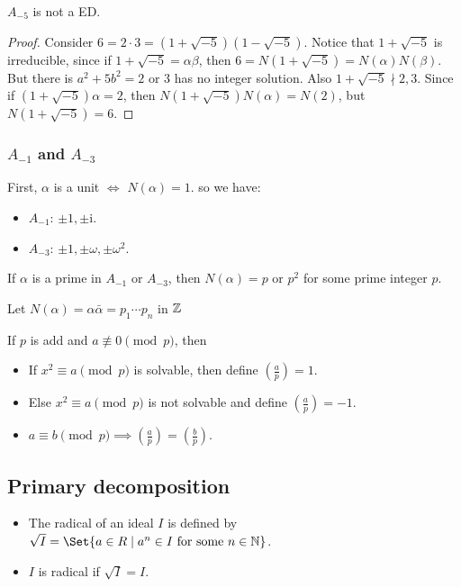 \begin{example}
  $A_{-5}$ is not a ED.

  \begin{proof}
    Consider $6 = 2 \cdot 3 = (1 + \sqrt{-5})(1 - \sqrt{-5})$.
    Notice that $1 + \sqrt{-5}$ is irreducible, since if $1 + \sqrt{-5} = \alpha \beta$,
    then $6 = N(1 + \sqrt{-5}) = N(\alpha) N(\beta)$. But there is
    $a^2 + 5b^2 = 2 \text{ or } 3$ has no integer solution.
    Also $1 + \sqrt{-5} \nmid 2, 3$. Since if $(1 + \sqrt{-5}) \alpha = 2$,
    then $N(1 + \sqrt{-5}) N(\alpha) = N(2)$, but $N(1 + \sqrt{-5}) = 6$.
  \end{proof}
\end{example}

\subsubsection{$A_{-1}$ and $A_{-3}$}
First, $\alpha$ is a unit $\iff$ $N(\alpha) = 1$.
so we have:
\begin{itemize}
  \item $A_{-1}$: $\pm 1, \pm \mathrm{i}$.
  \item $A_{-3}$: $\pm 1, \pm \omega, \pm \omega^2$.
\end{itemize}

If $\alpha$ is a prime in $A_{-1}$ or $A_{-3}$, then $N(\alpha) = p \text{ or } p^2$ for some prime integer $p$.

Let $N(\alpha)  = \alpha \bar\alpha = p_1 \dotsm p_n$ in $\mathbb{Z}$

\begin{definition}
  If $p$ is add and $a \not\equiv 0 \pmod{p}$, then
  \begin{itemize}
    \item If $x^2 \equiv a \pmod{p}$ is solvable, then define $\left( \frac{a}{p} \right) = 1$.
    \item Else $x^2 \equiv a \pmod{p}$ is not solvable and define $\left( \frac{a}{p} \right) = -1$.
  \end{itemize}
\end{definition}

\begin{prop} \hfill
  \begin{itemize}
    \item $a \equiv b \pmod{p} \implies \left( \frac{a}{p} \right) = \left( \frac{b}{p} \right)$.
  \end{itemize}
\end{prop}

\subsection{Primary decomposition}
\begin{definition} \hfill
  \begin{itemize}
    \item The radical of an ideal $I$ is defined by $\sqrt{I} = \Set{ a \in R \mid a^n \in I \text{ for some } n \in \Nb}$.
    \item $I$ is radical if $\sqrt{I} = I$.
  \end{itemize}
\end{definition}
